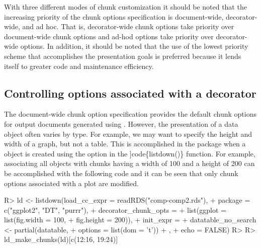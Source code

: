 \documentclass[
]{jss}
\begin{document}
With three different modes of chunk customization it should be noted
that the increasing priority of the chunk options specification is
document-wide, decorator-wide, and ad hoc. That is, decorator-wide chunk
options take priority over document-wide chunk options and ad-hod
options take priority over decorator-wide options. In addition, it
should be noted that the use of the lowest priority scheme that
accomplishes the presentation goals is preferred because it lends itself
to greater code and maintenance efficiency.

\hypertarget{controlling-options-associated-with-a-decorator}{%
\subsection{Controlling options associated with a
decorator}\label{controlling-options-associated-with-a-decorator}}

The document-wide chunk option specification provides the default chunk
options for output documents generated using . However,
the presentation of a data object often varies by type. For example, we
may want to specify the height and width of a graph, but not a table.
This is accomplished in the  package when a
 object is created using the 
option in the {]}code\{listdown()\} function. For example, associating
all  objects with  chunks having a width of 100
and a height of 200 can be accomplished with the following code and it
can be seen that only chunk options associated with a plot are modified.

\begin{CodeChunk}
\begin{CodeInput}
R> ld <- listdown(load_cc_expr = readRDS("comp-comp2.rds"),
+                package = c("ggplot2", "DT", "purrr"),
+                decorator_chunk_opts = 
+                  list(ggplot = list(fig.width = 100,
+                                     fig.height = 200)),
+                init_expr = {
+                  datatable_no_search <- partial(datatable,
+                                                 options = list(dom = 't'))
+                  },
+                echo = FALSE)
R> 
R> ld_make_chunks(ld)[c(12:16, 19:24)]
\end{CodeInput}
\end{CodeChunk}
\end{document}
